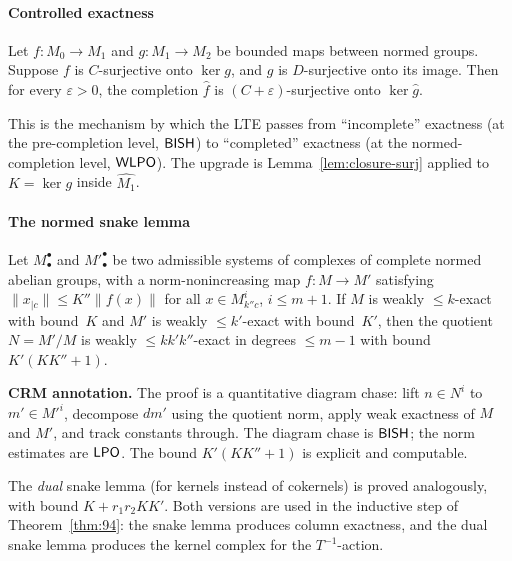 \paragraph{Controlled exactness}

\begin{lemma}
\label{lem:controlled-exact}
Let $f: M_0 \to M_1$ and $g: M_1 \to M_2$ be bounded maps between
normed groups.  Suppose $f$ is $C$-surjective onto $\ker g$, and
$g$ is $D$-surjective onto its image.  Then for every
$\varepsilon > 0$, the completion $\widehat{f}$ is
$(C+\varepsilon)$-surjective onto $\ker \widehat{g}$.
\end{lemma}

\noindent This is the mechanism by which the LTE passes from
``incomplete'' exactness (at the pre-completion level, $\textsf{BISH}$) to
``completed'' exactness (at the normed-completion level, $\textsf{WLPO}$).
The upgrade is Lemma~\ref{lem:closure-surj} applied to $K = \ker g$
inside $\widehat{M_1}$.

\paragraph{The normed snake lemma}

\begin{proposition}
\label{prop:snake}
Let $M_\bullet^\bullet$ and ${M'}_\bullet^\bullet$ be two admissible
systems of complexes of complete normed abelian groups, with a
norm-nonincreasing map $f: M \to M'$ satisfying
$\|x_{|c}\| \leq K'' \|f(x)\|$ for all $x \in M^i_{k''c}$,
$i \leq m+1$.  If $M$ is weakly $\leq k$-exact with bound~$K$
and $M'$ is weakly $\leq k'$-exact with bound~$K'$, then the
quotient $N = M'/M$ is weakly $\leq kk'k''$-exact in degrees
$\leq m-1$ with bound $K'(KK''+1)$.
\end{proposition}

\noindent\textbf{CRM annotation.}
The proof is a quantitative diagram chase: lift $n \in N^i$ to
$m' \in M'^i$, decompose $dm'$ using the quotient norm, apply
weak exactness of $M$ and $M'$, and track constants through.
The diagram chase is $\textsf{BISH}$; the norm estimates are $\textsf{LPO}$.
The bound $K'(KK''+1)$ is explicit and computable.

The \emph{dual} snake lemma (for kernels instead of cokernels)
is proved analogously, with bound $K + r_1 r_2 K K'$.
Both versions are used in the inductive step of Theorem~\ref{thm:94}:
the snake lemma produces column exactness,
and the dual snake lemma produces the kernel
complex for the $T^{-1}$-action.

